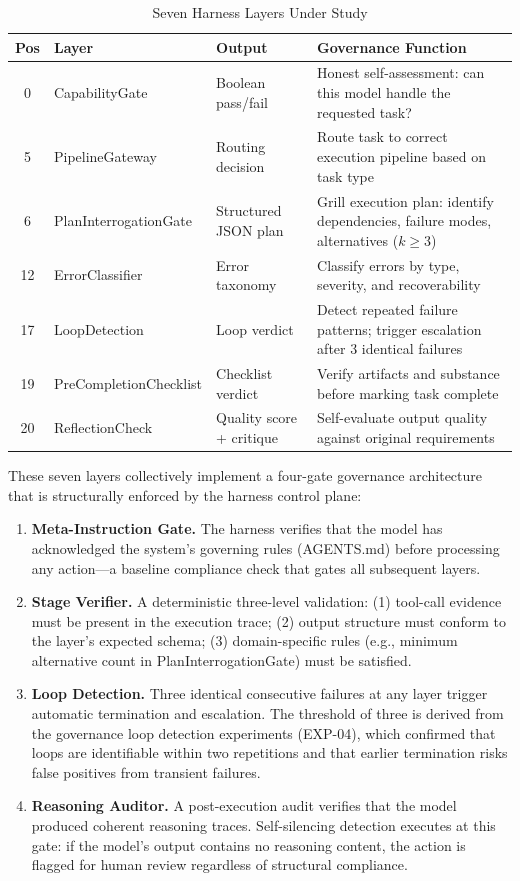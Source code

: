 \documentclass[11pt,a4paper]{article}
\begin{document}
\begin{table}[htbp]\centering\caption{Seven Harness Layers Under Study}\small
\begin{tabular}{cllp{5.5cm}}\toprule\textbf{Pos} & \textbf{Layer} & \textbf{Output} & \textbf{Governance Function}\\\midrule
0 & CapabilityGate & Boolean pass/fail & Honest self-assessment: can this model handle the requested task?\\
5 & PipelineGateway & Routing decision & Route task to correct execution pipeline based on task type\\
6 & PlanInterrogationGate & Structured JSON plan & Grill execution plan: identify dependencies, failure modes, alternatives ($k\geq3$)\\
12 & ErrorClassifier & Error taxonomy & Classify errors by type, severity, and recoverability\\
17 & LoopDetection & Loop verdict & Detect repeated failure patterns; trigger escalation after 3 identical failures\\
19 & PreCompletionChecklist & Checklist verdict & Verify artifacts and substance before marking task complete\\
20 & ReflectionCheck & Quality score + critique & Self-evaluate output quality against original requirements\\\bottomrule
\end{tabular}
\end{table}

These seven layers collectively implement a four-gate governance architecture that is structurally enforced by the harness control plane:

\begin{enumerate}[label=\textbf{Gate \arabic*:}, leftmargin=*]
\item \textbf{Meta-Instruction Gate.} The harness verifies that the model has acknowledged the system's governing rules (AGENTS.md) before processing any action---a baseline compliance check that gates all subsequent layers.
\item \textbf{Stage Verifier.} A deterministic three-level validation: (1) tool-call evidence must be present in the execution trace; (2) output structure must conform to the layer's expected schema; (3) domain-specific rules (e.g., minimum alternative count in PlanInterrogationGate) must be satisfied.
\item \textbf{Loop Detection.} Three identical consecutive failures at any layer trigger automatic termination and escalation. The threshold of three is derived from the governance loop detection experiments (EXP-04), which confirmed that loops are identifiable within two repetitions and that earlier termination risks false positives from transient failures.
\item \textbf{Reasoning Auditor.} A post-execution audit verifies that the model produced coherent reasoning traces. Self-silencing detection executes at this gate: if the model's output contains no reasoning content, the action is flagged for human review regardless of structural compliance.
\end{enumerate}
\end{document}
